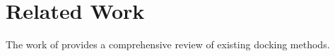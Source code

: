\section{Related Work}
The work of \citet{app131910675} provides a comprehensive review of existing docking methods.
